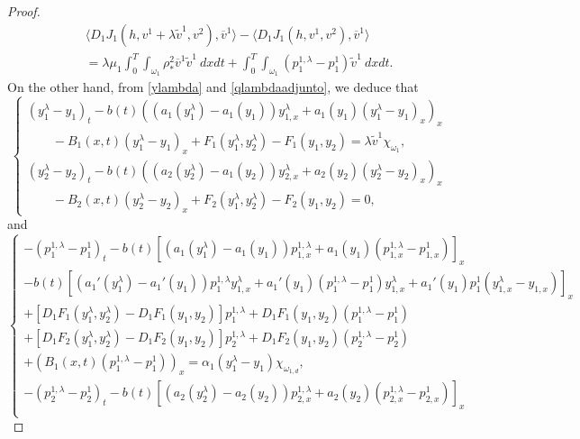 \documentclass[11pt,a4paper]{amsart}
\numberwithin{equation}{section}
\begin{document}
\begin{proof}
\begin{equation}
\begin{split}
          &\langle D_1 J_1(h,v^1+\lambda\widetilde{v}^1,v^2 ),\overline{v}^1 \rangle-  \langle D_1 J_1(h,v^1,v^2 ),\overline{v}^1 \rangle \\
          &=\lambda \mu_1 \int_{0}^{T}\int_{\omega_1} \rho_*^2 \overline{v}^1\widetilde{v}^1 \ dxdt
 	      +\int_{0}^{T}\int_{\omega_{1}}\left( p^{1,\lambda}_1-p^{1}_1 \right)\widetilde{v}^1 \ dx dt.   
        \end{split}
    \end{equation}On the other hand, from \eqref{ylambda} and \eqref{qlambdaadjunto}, we deduce that
    \begin{equation}\label{auxaux_1}
    \begin{cases}
		(y_1^\lambda-y_1)_{t}-b(t)\left((a_1(y^\lambda_{1})-a_1(y_{1}))y^\lambda_{1,x} + a_1(y_{1})(y_1^\lambda-y_1)_{x}\right)_x \\
        \qquad -B_1(x,t) (y_1^\lambda-y_1)_{x}+F_1(y^\lambda_1,y^\lambda_2)-F_1(y_1,y_2)=\lambda\widetilde{v}^1\chi_{\omega_1}, &\\
		(y_2^\lambda-y_2)_{t}-b(t)\left((a_2(y^\lambda_{2})-a_1(y_{2}))y^\lambda_{2,x} + a_2(y_{2})(y_2^\lambda-y_2)_{x}\right)_x \\
        \qquad -B_2(x,t) (y_2^\lambda-y_2)_{x}
        +F_2(y^\lambda_1,y^\lambda_2)-F_2(y_1,y_2)=0,&
	\end{cases}
    \end{equation}and
    \begin{equation}\label{auxaux_2}
      \begin{cases}
			-(p^{1,\lambda}_1-p^{1}_1)_{t}  -b(t)\left[ (a_1(y_1^\lambda)-a_1(y_1))p^{1,\lambda}_{1,x} + a_1(y_1) (p^{1,\lambda}_{1,x}-p^1_{1,x}) \right]_x \\
            -b(t)\left[(a_1'(y_1^\lambda)-a_1'(y_1))p^{1,\lambda}_1 y^\lambda_{1,x} + a_1'(y_1)(p^{1,\lambda}_1-p^1_1)y^\lambda_{1,x} + a_1'(y_1)p^1_1 (y^\lambda_{1,x}-y_{1,x})\right]_x\\
			+[D_1 F_1(y_1^\lambda,y_2^\lambda)-D_1 F_1(y_1,y_2)]p^{1,\lambda}_1 + D_1 F_1(y_1,y_2)(p^{1,\lambda}_1-p^{1}_1)\\
            +[D_1 F_2(y_1^\lambda,y_2^\lambda)-D_1 F_2(y_1,y_2)]p^{1,\lambda}_2 + D_1 F_2(y_1,y_2)(p^{1,\lambda}_2-p^{1}_2) \\
            +\left(B_1(x,t)(p^{1,\lambda}_1-p^{1}_1)\right)_x=\alpha_1\left( y^\lambda_1-y_1  \right)\chi_{\omega_{1,d}},  \\
			-(p^{1,\lambda}_2-p^{1}_2)_{t}   -b(t)\left[ (a_2(y_2^\lambda)-a_2(y_2))p^{1,\lambda}_{2,x} + a_2(y_2) (p^{1,\lambda}_{2,x}-p^1_{2,x}) \right]_x \\

\end{cases}
\end{equation}
\end{proof}
\end{document}

